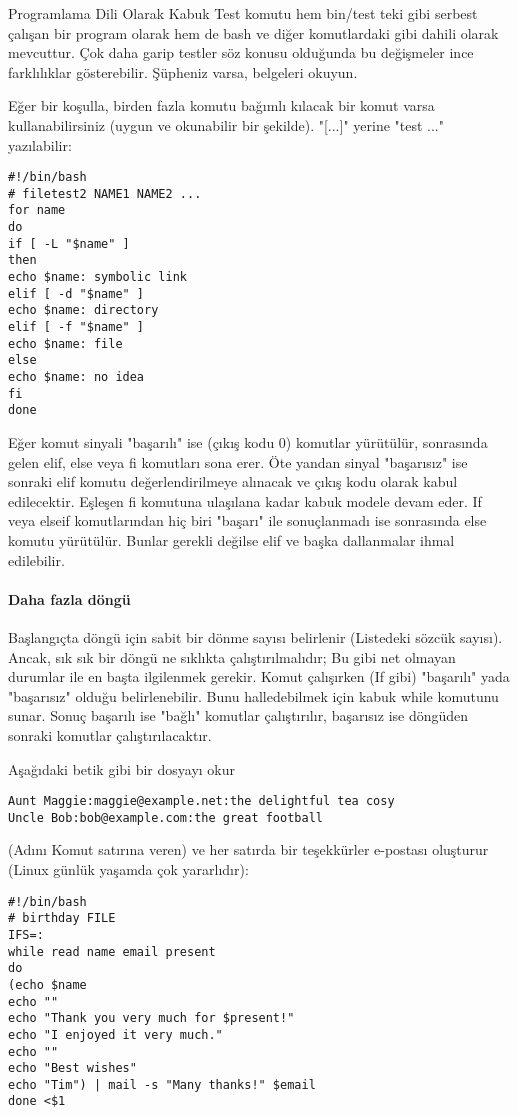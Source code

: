 \begin{section}{Programlama Dili Olarak Kabuk}
Test komutu hem bin/test teki gibi serbest çalışan bir program olarak hem de bash ve diğer komutlardaki gibi dahili olarak mevcuttur. Çok daha garip testler söz konusu olduğunda bu değişmeler ince farklılıklar gösterebilir. Şüpheniz varsa, belgeleri okuyun.

Eğer bir koşulla, birden fazla komutu bağımlı kılacak bir komut varsa kullanabilirsiniz (uygun ve okunabilir bir şekilde). "[...]" yerine "test ..." yazılabilir:
\begin{verbatim}
#!/bin/bash
# filetest2 NAME1 NAME2 ...
for name
do
if [ -L "$name" ]
then
echo $name: symbolic link
elif [ -d "$name" ]
echo $name: directory
elif [ -f "$name" ]
echo $name: file
else
echo $name: no idea
fi
done
\end{verbatim}

Eğer komut sinyali "başarılı" ise (çıkış kodu 0) komutlar yürütülür, sonrasında gelen elif, else veya fi komutları sona erer. Öte yandan sinyal "başarısız" ise sonraki elif komutu değerlendirilmeye alınacak ve çıkış kodu olarak kabul edilecektir. Eşleşen fi komutuna ulaşılana kadar kabuk modele devam eder. If veya elseif komutlarından hiç biri "başarı" ile sonuçlanmadı ise sonrasında else komutu yürütülür. Bunlar gerekli değilse elif ve başka dallanmalar ihmal edilebilir.

\paragraph{Daha fazla döngü}{Başlangıçta döngü için sabit bir dönme sayısı belirlenir (Listedeki sözcük sayısı). Ancak, sık sık bir döngü ne sıklıkta çalıştırılmalıdır; Bu gibi net olmayan durumlar ile en başta ilgilenmek gerekir. Komut çalışırken (If gibi) "başarılı" yada "başarısız" olduğu belirlenebilir. Bunu halledebilmek için kabuk while komutunu sunar. Sonuç başarılı ise "bağlı" komutlar çalıştırılır, başarısız ise döngüden sonraki komutlar çalıştırılacaktır.}

Aşağıdaki betik gibi bir dosyayı okur
\begin{verbatim}
Aunt Maggie:maggie@example.net:the delightful tea cosy
Uncle Bob:bob@example.com:the great football
\end{verbatim}

(Adını Komut satırına veren) ve her satırda bir teşekkürler e-postası oluşturur (Linux günlük yaşamda çok yararlıdır):
\begin{verbatim}
#!/bin/bash
# birthday FILE
IFS=:
while read name email present
do
(echo $name
echo ""
echo "Thank you very much for $present!"
echo "I enjoyed it very much."
echo ""
echo "Best wishes"
echo "Tim") | mail -s "Many thanks!" $email
done <$1
\end{verbatim}


\end{section}
